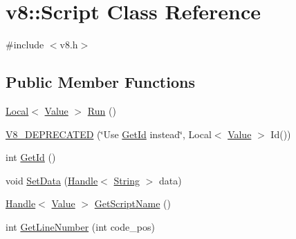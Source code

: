 \hypertarget{classv8_1_1_script}{}\section{v8\+:\+:Script Class Reference}
\label{classv8_1_1_script}


{\ttfamily \#include $<$v8.\+h$>$}

\subsection*{Public Member Functions}
\begin{DoxyCompactItemize}
\item 
\hyperlink{classv8_1_1_local}{Local}$<$ \hyperlink{classv8_1_1_value}{Value} $>$ \hyperlink{classv8_1_1_script_a5f43b29d40bd51ebad2cc275ba3898a1}{Run} ()
\item 
\hyperlink{classv8_1_1_script_aa17833cc07c0ea133f24ccfae1f8dbaa}{V8\+\_\+\+D\+E\+P\+R\+E\+C\+A\+T\+E\+D} (\char`\"{}Use \hyperlink{classv8_1_1_script_aacb1cf3b66a6542b898042689221d3d5}{Get\+Id} instead\char`\"{}, Local$<$ \hyperlink{classv8_1_1_value}{Value} $>$ Id())
\item 
int \hyperlink{classv8_1_1_script_aacb1cf3b66a6542b898042689221d3d5}{Get\+Id} ()
\item 
void \hyperlink{classv8_1_1_script_a048fa4168b809ca73cc435e341e41b0b}{Set\+Data} (\hyperlink{classv8_1_1_handle}{Handle}$<$ \hyperlink{classv8_1_1_string}{String} $>$ data)
\item 
\hyperlink{classv8_1_1_handle}{Handle}$<$ \hyperlink{classv8_1_1_value}{Value} $>$ \hyperlink{classv8_1_1_script_af8ce37d0733b79046e8ccb76baa5d0d9}{Get\+Script\+Name} ()
\item 
int \hyperlink{classv8_1_1_script_a5cb7ed6fe0046a5b66c8810ab4a09876}{Get\+Line\+Number} (int code\+\_\+pos)
\end{DoxyCompactItemize}
